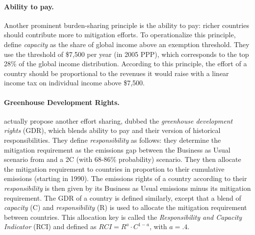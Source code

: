 \paragraph{Ability to pay.} Another prominent burden-sharing principle is the ability to pay: richer countries should contribute more to mitigation efforts. To operationalize this principle, \citet{baer_greenhouse_2008} define \textit{capacity} as the share of global income above an exemption threshold. They use the threshold of \$7,500 per year (in 2005 PPP), which corresponds to the top 28\% of the global income distribution. According to this principle, the effort of a country should be proportional to the revenues it would raise with a linear income tax on individual income above \$7,500. 

\paragraph{Greenhouse Development Rights.} \citet{baer_greenhouse_2008} actually propose another effort sharing, dubbed the \textit{greenhouse development rights} (GDR), which blends ability to pay and their version of historical responsibilities. They define \textit{responsibility} as follows: they determine the mitigation requirement as the emissions gap between the Business as Usual scenario from \citet{iea_world_2007} and a 2\textdegree{}C (with 68-86\% probability) scenario. They then allocate the mitigation requirement to countries in proportion to their cumulative emissions (starting in 1990). The emissions rights of a country according to their \textit{responsibility} is then given by its Business as Usual emissions minus its mitigation requirement. The GDR of a country is defined similarly, except that a blend of \textit{capacity} (C) and \textit{responsibility} (R) is used to allocate the mitigation requirement between countries. This allocation key is called the \textit{Responsibility and Capacity Indicator} (RCI) and defined as $RCI = R^{a}\cdot C^{1-a}$, with $a=.4$. %

